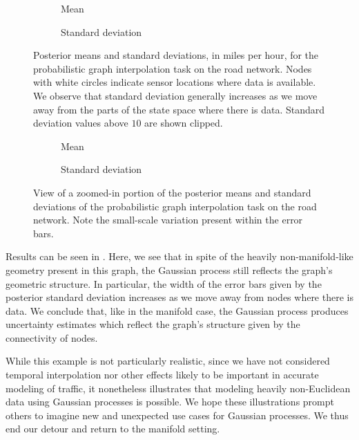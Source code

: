 \documentclass[11pt]{book}
\begin{document}
\begin{figure}
\begin{subfigure}{0.49\textwidth}

\caption{Mean}
\end{subfigure}
\begin{subfigure}{0.49\textwidth}

\caption{Standard deviation}
\end{subfigure}
\caption{Posterior means and standard deviations, in miles per hour, for the probabilistic graph interpolation task on the road network. Nodes with white circles indicate sensor locations where data is available. We observe that standard deviation generally increases as we move away from the parts of the state space where there is data. Standard deviation values above $10$ are shown clipped. }
\label{fig:graph-posterior}
\end{figure}

\begin{figure}
\begin{subfigure}{0.49\textwidth}

\caption{Mean}
\end{subfigure}
\begin{subfigure}{0.49\textwidth}

\caption{Standard deviation}
\end{subfigure}
\caption{View of a zoomed-in portion of the posterior means and standard deviations of the probabilistic graph interpolation task on the road network. Note the small-scale variation present within the error bars.}
\end{figure}



Results can be seen in .
Here, we see that in spite of the heavily non-manifold-like geometry present in this graph, the Gaussian process still reflects the graph's geometric structure.
In particular, the width of the error bars given by the posterior standard deviation increases as we move away from nodes where there is data.
We conclude that, like in the manifold case, the Gaussian process produces uncertainty estimates which reflect the graph's structure given by the connectivity of nodes.

While this example is not particularly realistic, since we have not considered temporal interpolation nor other effects likely to be important in accurate modeling of traffic, it nonetheless illustrates that modeling heavily non-Euclidean data using Gaussian processes is possible.
We hope these illustrations prompt others to imagine new and unexpected use cases for Gaussian processes.
We thus end our detour and return to the manifold setting.
\end{document}
